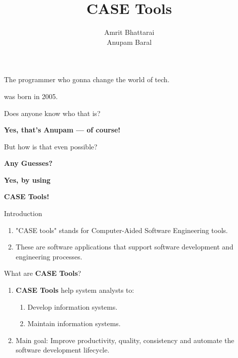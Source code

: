 \documentclass[14pt, aspectratio=169]{beamer}
\title{CASE Tools}
\author{Amrit Bhattarai\\Anupam Baral}
\begin{document}
\maketitle

\begin{frame}[plain]{}
	\vfill
	\centering
	{\Huge The programmer who gonna change the world of tech.} \par \pause
	\vspace{1em}
	{\LARGE was born in \textcolor{alert}{2005}.} \par \pause
	\vspace{1em}
	{\large Does anyone know who that is?} \par \pause
	\vspace{1em}
	{\Huge \textbf{Yes, that’s Anupam — of course!}}
	\vfill
\end{frame}

\begin{frame}[plain]{}
	\vfill
	\centering
	{\Huge But how is that even possible?} \par \pause
	\vspace{2em}
	{\Huge \textbf{Any Guesses?}}
	\vfill
\end{frame}

\begin{frame}[plain]{}
	\vfill
	\centering
	{\Huge \textbf{Yes, by using}} \par
	\vspace{1em}
	{\Huge \textbf{\textcolor{alert}{CASE Tools!}}}
	\vfill
\end{frame}

\begin{frame}{Introduction}
	\begin{enumerate}
		\item<1-> "CASE tools" stands for \textcolor{alert}{Computer-Aided Software Engineering} tools. \pause
		\item<2-> These are software applications that support software development and engineering processes.
	\end{enumerate}
\end{frame}


\begin{frame}{What are \textbf{CASE Tools}?}
	\begin{enumerate}
		\item<1-> \textbf{CASE Tools} help system analysts to: \pause
			\begin{enumerate}
				\item Develop information systems.
				\item Maintain information systems. \pause
			\end{enumerate}
		\item<2-> Main goal: Improve \textcolor{alert}{productivity, quality, consistency} and
			\textcolor{alert}{automate} the software development lifecycle.
	\end{enumerate}
\end{frame}
\end{document}
